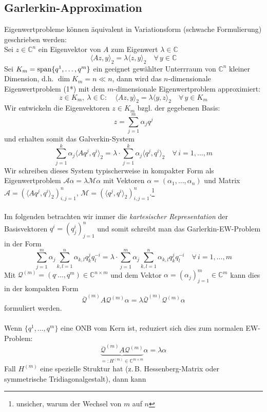 \subsection{Garlerkin-Approximation}
Eigenwertprobleme können äquivalent in Variationsform (schwache Formulierung) geschrieben werden:\\
Sei $z\in\mathbb{C}^n$ ein Eigenvektor von $A$ zum Eigenwert $\lambda\in\mathbb{C}$
\[\langle Az,y\rangle_2 = \lambda\langle z,y\rangle_2 \quad\forall\,y\in\mathbb{C}\tag{1*}\]
Sei $K_m=\text{span}\{q^1,\dotsc,q^m\}$ ein geeignet gewählter Unterrraum von $\mathbb{C}^n$ kleiner Dimension, d.h. 
$\dim K_m=n\ll n$, dann wird das $n$-dimensionale Eigenwertproblem (1*) mit dem $m$-dimensionale Eigenwertproblem
approximiert: 
\[z\in K_m, \ \lambda\in\mathbb{C}: \quad \langle Az,y\rangle_2=\lambda\langle y,z\rangle_2 \quad\forall\,y\in K_m\]
Wir entwickeln die Eigenvektoren $z\in K_m$ bzgl. der gegebenen Basis:
\[z = \sum_{j=1}^{m} \alpha_j q^j\]
und erhalten somit das Galverkin-System
\[\sum_{j=1}^{k} \alpha_j \langle Aq^j,q^i\rangle_2 = \lambda\cdot\sum_{j=1}^{k} \alpha_j \langle q^j,q^i\rangle_2
\quad\forall\,i=1,\dotsc,m\]
Wir schreiben dieses System typischerweise in kompakter Form als Eigenwertproblem 
$\mathcal{A}\alpha = \lambda\mathcal{M}\alpha$ mit Vektoren $\alpha=(\alpha_1,\dotsc,\alpha_n)$ und Matrix $\mathcal{A}=(\langle Aq^j, q^i\rangle_2)_{i,j=1}^n$, 
$\mathcal{M} = (\langle q^j, q^i\rangle_2)_{i,j=1}^n$.\footnote{
unsicher, warum der Wechsel von $m$ auf $n$} \\ \\
Im folgenden betrachten wir immer die \textit{kartesischer Representation} der Basisvektoren $q^{i}=(q_j^i)_{j=1}^n$ 
und somit schreibt man das Garlerkin-EW-Problem in der Form
\[\sum_{j=1}^{m} \alpha_j \sum_{k,l=1}^{n} \alpha_{k,l} q_k^{j}q_l^{-i} = \lambda\cdot \sum_{j=1}^{m} \alpha_j
\sum_{k,l=1}^{n} \alpha_{k,l} q_k^{j}q_l^{-i}\quad\forall\, i=1,\dotsc,m\]
Mit $\mathcal{Q}^{(m)}=(q^,\dotsc,q^m)\in\mathbb{C}^{n\times m}$  und dem Vektor $\alpha=(\alpha_j)_{j=1}^m\in\mathbb{C}^m$ 
kann dies in der kompakten Form 
\[\overline{\mathcal{Q}}^{(m)}A\mathcal{Q}^{(m)}\alpha = \lambda \overline{\mathcal{Q}}^{(m)}\mathcal{Q}^{(m)}\alpha\]
formuliert werden. \\ \\
Wenn $\{q^1,\dotsc,q^m\}$ eine ONB vom Kern ist, reduziert sich dies zum normalen EW-Problem:
\[\underbrace{\overline{\mathcal{Q}}^{(m)}A\mathcal{Q}^{(m)}}_{=: H^{(m)}\in\mathbb{C}^{m\times m}}\alpha = 
\lambda \alpha \tag{2*}\]
Fall $H^{(m)}$ eine spezielle Struktur hat (z.\,B. Hessenberg-Matrix oder symmetrische Tridiagonalgestalt), dann kann 
